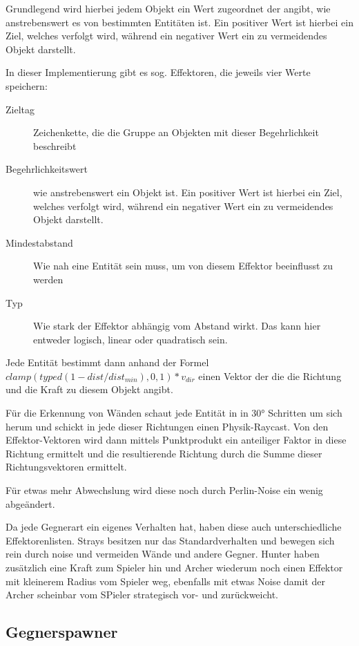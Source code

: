 \documentclass[a4paper,10pt,ngerman,fontsize=12pt]{scrreprt}
\begin{document}
Grundlegend wird hierbei jedem Objekt ein Wert zugeordnet der angibt, wie anstrebenswert es von bestimmten Entitäten ist. Ein positiver Wert ist hierbei ein Ziel, welches verfolgt wird, während ein negativer Wert ein zu vermeidendes Objekt darstellt.

In dieser Implementierung gibt es sog. Effektoren, die jeweils vier Werte speichern:

\begin{description}
\item[Zieltag] Zeichenkette, die die Gruppe an Objekten mit dieser Begehrlichkeit beschreibt
\item[Begehrlichkeitswert] wie anstrebenswert ein Objekt ist. Ein positiver Wert ist hierbei ein Ziel, welches verfolgt wird, während ein negativer Wert ein zu vermeidendes Objekt darstellt.
\item[Mindestabstand] Wie nah eine Entität sein muss, um von diesem Effektor beeinflusst zu werden
\item[Typ] Wie stark der Effektor abhängig vom Abstand wirkt. Das kann hier entweder logisch, linear oder quadratisch sein. 
\end{description}

Jede Entität bestimmt dann anhand der Formel $ clamp(typed(1 - dist / dist_{min}), 0, 1) * v_{dir} $ einen Vektor der die die Richtung und die Kraft zu diesem Objekt angibt.

Für die Erkennung von Wänden schaut jede Entität in in 30° Schritten um sich herum und schickt in jede dieser Richtungen einen Physik-Raycast. Von den Effektor-Vektoren wird dann  mittels Punktprodukt ein anteiliger Faktor in diese Richtung ermittelt und die resultierende Richtung durch die Summe dieser Richtungsvektoren ermittelt.

Für etwas mehr Abwechslung wird diese noch durch Perlin-Noise ein wenig abgeändert.

Da jede Gegnerart ein eigenes Verhalten hat, haben diese auch unterschiedliche Effektorenlisten. Strays besitzen nur das Standardverhalten und bewegen sich rein durch noise und vermeiden Wände und andere Gegner. Hunter haben zusätzlich eine Kraft zum Spieler hin und Archer wiederum noch einen Effektor mit kleinerem Radius vom Spieler weg, ebenfalls mit etwas Noise damit der Archer scheinbar vom SPieler strategisch vor- und zurückweicht.



\subsection{Gegnerspawner}
\label{subsect:spawner}
\end{document}
